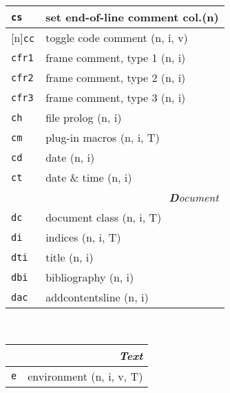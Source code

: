 \documentclass[oneside,10pt,landscape,DIV16]{scrartcl}
\newcommand{\Rep}{{\scriptsize{[n]}}}
\newcommand{\Map}[1] {\textbf{\textasciiacute}\texttt{#1}}
\begin{document}
\begin{multicols}{3}
\begin{center}
\begin{tabular}[]{|p{11mm}|p{60mm}|}
\hline     \Map{cs}   & set end-of-line comment col.\hfill (n)      \\
%
\hline \Rep\Map{cc}   & toggle code comment         \hfill (n, i, v)\\
%
\hline     \Map{cfr1} & frame comment, type 1       \hfill (n, i)   \\
\hline     \Map{cfr2} & frame comment, type 2       \hfill (n, i)   \\
\hline     \Map{cfr3} & frame comment, type 3       \hfill (n, i)   \\
\hline     \Map{ch}   & file prolog                 \hfill (n, i)   \\
\hline     \Map{cm}   & plug-in macros              \hfill (n, i, T)\\
\hline     \Map{cd}   & date                        \hfill (n, i)   \\
\hline     \Map{ct}   & date \& time                \hfill (n, i)   \\
\hline
\hline
\multicolumn{2}{|r|}{\textsl{\textbf{D}ocument}}                 \\[1.0ex]
\hline     \Map{dc}  &  document class              \hfill (n, i, T)\\
\hline     \Map{di}  &  indices                     \hfill (n, i, T)\\
\hline     \Map{dti} &  title                       \hfill (n, i)\\
\hline     \Map{dbi} &  bibliography                \hfill (n, i)\\
\hline     \Map{dac} &  addcontentsline             \hfill (n, i)\\
\hline
%
\end{tabular}\\
%
\begin{tabular}[]{|p{11mm}|p{60mm}|}
\hline
\multicolumn{2}{|r|}{\textsl{\textbf{T}ext}}                 \\[1.0ex]
\hline \Map{e}    & environment                    \hfill (n, i, v, T)\\

\end{tabular}
\end{center}
\end{multicols}
\end{document}
